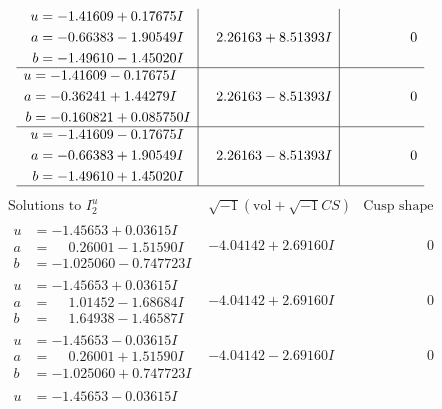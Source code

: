 \documentclass[1p]{elsarticle_modified}
\theoremstyle{definition}
\newcommand{\I}{\sqrt{-1}}
\begin{document}
$$\begin{array}{c|c|c}
\begin{aligned}
u &= -1.41609 + 0.17675 I \\
a &= -0.66383 - 1.90549 I \\
b &= -1.49610 - 1.45020 I\end{aligned}
 & \phantom{-}2.26163 + 8.51393 I & \phantom{-0.000000 } 0 \\ \hline\begin{aligned}
u &= -1.41609 - 0.17675 I \\
a &= -0.36241 + 1.44279 I \\
b &= -0.160821 + 0.085750 I\end{aligned}
 & \phantom{-}2.26163 - 8.51393 I & \phantom{-0.000000 } 0 \\ \hline\begin{aligned}
u &= -1.41609 - 0.17675 I \\
a &= -0.66383 + 1.90549 I \\
b &= -1.49610 + 1.45020 I\end{aligned}
 & \phantom{-}2.26163 - 8.51393 I & \phantom{-0.000000 } 0\\
 \hline 
 \end{array}$$\newpage$$\begin{array}{c|c|c}  
\text{Solutions to }I^u_{2}& \I (\text{vol} + \sqrt{-1}CS) & \text{Cusp shape}\\
 \hline 
\begin{aligned}
u &= -1.45653 + 0.03615 I \\
a &= \phantom{-}0.26001 - 1.51590 I \\
b &= -1.025060 - 0.747723 I\end{aligned}
 & -4.04142 + 2.69160 I & \phantom{-0.000000 } 0 \\ \hline\begin{aligned}
u &= -1.45653 + 0.03615 I \\
a &= \phantom{-}1.01452 - 1.68684 I \\
b &= \phantom{-}1.64938 - 1.46587 I\end{aligned}
 & -4.04142 + 2.69160 I & \phantom{-0.000000 } 0 \\ \hline\begin{aligned}
u &= -1.45653 - 0.03615 I \\
a &= \phantom{-}0.26001 + 1.51590 I \\
b &= -1.025060 + 0.747723 I\end{aligned}
 & -4.04142 - 2.69160 I & \phantom{-0.000000 } 0 \\ \hline\begin{aligned}
u &= -1.45653 - 0.03615 I \\

\end{aligned}
\end{array}$$
\end{document}
